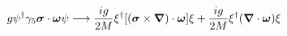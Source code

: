 \begin{equation}
g \psi^{\dag} \gamma_{5} \mbox{\boldmath $\sigma$} \cdot \mbox{\boldmath 
$\omega$} \psi \longrightarrow
\frac{i g}{2M} \xi^{\dag}[(\mbox{\boldmath $\sigma$} \times \mbox{\boldmath $\nabla$}) \cdot 
\mbox{\boldmath $\omega$}] \xi +
\frac{i g}{2M} \xi^{\dag} (\mbox{\boldmath $\nabla$} \cdot 
\mbox{\boldmath $\omega$})  \xi 
\end{equation}

